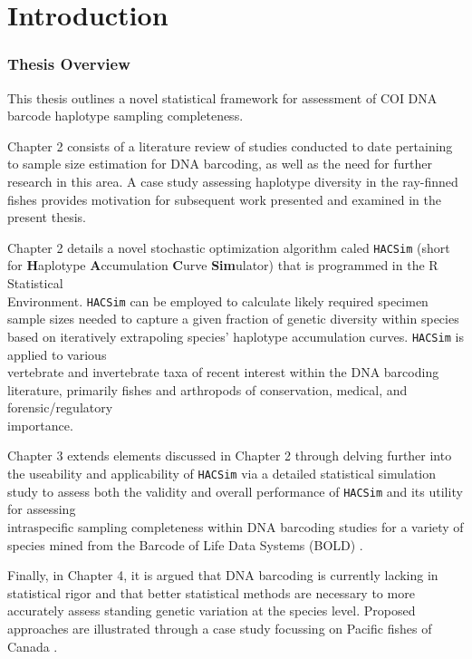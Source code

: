 \linespread{1.0}

\chapter{Introduction}
\subsection{Thesis Overview} \label{sec:intro1}

This thesis outlines a novel statistical framework for assessment of COI DNA barcode haplotype sampling completeness. 

Chapter 2 consists of a literature review of studies conducted to date pertaining to sample size estimation for DNA barcoding, as well as the need for further research in this area. A case study assessing haplotype diversity in the ray-finned fishes \cite{phillips2015exploration} provides motivation for subsequent work presented and examined in the present thesis. 

Chapter 2 details a novel stochastic optimization algorithm caled {\tt HACSim} (short for \textbf{H}aplotype \textbf{A}ccumulation \textbf{C}urve \textbf{Sim}ulator) that is programmed in the R Statistical \\ Environment. {\tt HACSim} can be employed to calculate likely required specimen sample sizes needed to capture a given fraction of genetic diversity within species based on iteratively extrapoling species' haplotype accumulation curves. {\tt HACSim} is applied to various \\ vertebrate and invertebrate taxa of recent interest within the DNA barcoding literature, primarily fishes and arthropods of conservation, medical, and forensic/regulatory \\ importance.

Chapter 3 extends elements discussed in Chapter 2 through delving further into the useability and applicability of {\tt HACSim} via a detailed statistical simulation study to assess both the validity and overall performance of {\tt HACSim} and its utility for assessing \\ intraspecific sampling completeness within DNA barcoding studies for a variety of species mined from the Barcode of Life Data Systems (BOLD) \cite{ratnasingham2007bold}.

Finally, in Chapter 4, it is argued that DNA barcoding is currently lacking in statistical rigor and that better statistical methods are necessary to more accurately assess standing genetic variation at the species level. Proposed approaches are illustrated through a case study focussing on Pacific fishes of Canada \cite{steinke2009dna}.


